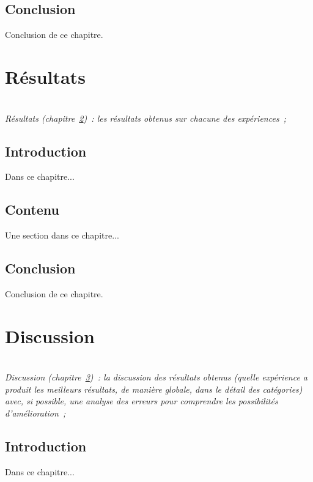 \documentclass[a4paper,11pt,twoside]{memoir}
\begin{document}
\section{Conclusion}
Conclusion de ce chapitre.



\chapter{Résultats}
\label{chap:resultats}
\minitoc

\textit{\\Résultats (chapitre~\ref{chap:resultats})~: les résultats
obtenus sur chacune des expériences~;}

\section{Introduction}
Dans ce chapitre...

\section{Contenu}
Une section dans ce chapitre...

\section{Conclusion}
Conclusion de ce chapitre.



\chapter{Discussion}
\label{chap:discussion}
\minitoc

\textit{\\Discussion (chapitre~\ref{chap:discussion})~: la discussion des
résultats obtenus (quelle expérience a produit les meilleurs
résultats, de manière globale, dans le détail des catégories) avec,
si possible, une analyse des erreurs pour comprendre les
possibilités d'amélioration~;}

\section{Introduction}
Dans ce chapitre...
\end{document}
